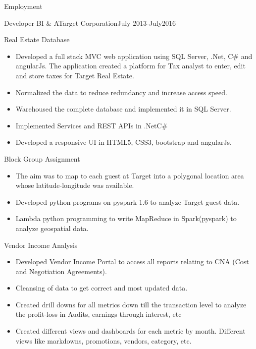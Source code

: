 \documentclass[]{mcdowellcv}
\begin{document}
	\makeheader
	
	\begin{cvsection}{Employment}
		\begin{cvsubsection}{Developer BI \& A}{Target Corporation}{July 2013-July2016}
		\begin{cvsubsection}{Real Estate Database}{}{}
				\begin{itemize}
					\item	Developed a full stack MVC web application using SQL Server, .Net, C\# and angularJs. The application created a platform for Tax analyst to enter, edit and store taxes for Target Real Estate.
					\item Normalized the data to reduce redundancy and increase access speed. 
					\item Warehoused the complete database and implemented it in SQL Server.
					\item Implemented Services and REST APIs in .Net\/C\#
					\item Developed a responsive UI in HTML5, CSS3, bootstrap and angularJs.
				\end{itemize}
			\end{cvsubsection}
			\begin{cvsubsection}{Block Group Assignment}{}{}
				\begin{itemize}
					\item The aim was to map to each guest at Target into a polygonal location area whose latitude-longitude was available.
					\item Developed python programs on pyspark-1.6 to analyze Target guest data.   
					\item Lambda python programming to write MapReduce in Spark(pyspark) to analyze geospatial data.
				\end{itemize}
			\end{cvsubsection}
			\begin{cvsubsection}{Vendor Income Analysis}{}{}
				\begin{itemize}
					\item Developed Vendor Income Portal to access all reports relating to CNA (Cost and Negotiation Agreements).
					\item Cleansing of data to get correct and most updated data.
					\item Created drill downs for all metrics down till the transaction level to analyze the profit-loss in Audits, earnings through interest, etc
					\item Created different views and dashboards for each metric by month. Different views like markdowns, promotions, vendors, category, etc.

\end{itemize}
\end{cvsubsection}
\end{cvsubsection}
\end{cvsection}
\end{document}
